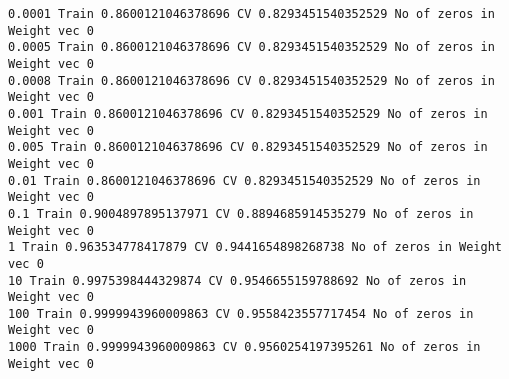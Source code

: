 \documentclass[11pt]{article}
\begin{document}
    \begin{Verbatim}[commandchars=\\\{\}]
0.0001 Train 0.8600121046378696 CV 0.8293451540352529 No of zeros in Weight vec 0
0.0005 Train 0.8600121046378696 CV 0.8293451540352529 No of zeros in Weight vec 0
0.0008 Train 0.8600121046378696 CV 0.8293451540352529 No of zeros in Weight vec 0
0.001 Train 0.8600121046378696 CV 0.8293451540352529 No of zeros in Weight vec 0
0.005 Train 0.8600121046378696 CV 0.8293451540352529 No of zeros in Weight vec 0
0.01 Train 0.8600121046378696 CV 0.8293451540352529 No of zeros in Weight vec 0
0.1 Train 0.9004897895137971 CV 0.8894685914535279 No of zeros in Weight vec 0
1 Train 0.963534778417879 CV 0.9441654898268738 No of zeros in Weight vec 0
10 Train 0.9975398444329874 CV 0.9546655159788692 No of zeros in Weight vec 0
100 Train 0.9999943960009863 CV 0.9558423557717454 No of zeros in Weight vec 0
1000 Train 0.9999943960009863 CV 0.9560254197395261 No of zeros in Weight vec 0

    \end{Verbatim}
\end{document}
